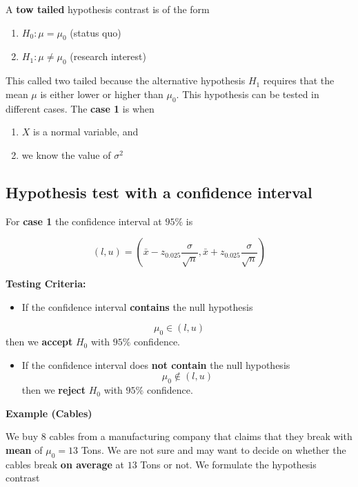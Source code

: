 \documentclass[
]{book}
\providecommand{\tightlist}{%
  \setlength{\itemsep}{0pt}\setlength{\parskip}{0pt}}
\begin{document}
A \textbf{tow tailed} hypothesis contrast is of the form

\begin{enumerate}
\def\labelenumi{\alph{enumi}.}
\tightlist
\item
  \(H_0:\mu = \mu_0\) (status quo)
\item
  \(H_1:\mu \neq \mu_0\) (research interest)
\end{enumerate}

This called two tailed because the alternative hypothesis \(H_1\) requires that the mean \(\mu\) is either lower or higher than \(\mu_0\). This hypothesis can be tested in different cases. The \textbf{case 1} is when

\begin{enumerate}
\def\labelenumi{\arabic{enumi}.}
\tightlist
\item
  \(X\) is a normal variable, and
\item
  we know the value of \(\sigma^2\)
\end{enumerate}

\hypertarget{hypothesis-test-with-a-confidence-interval}{%
\subsection{Hypothesis test with a confidence interval}\label{hypothesis-test-with-a-confidence-interval}}

For \textbf{case 1} the confidence interval at \(95\%\) is

\[(l,u)=(\bar{x}-z_{0.025} \frac{\sigma}{\sqrt{n}}, \bar{x}+z_{0.025} \frac{\sigma}{\sqrt{n}})\]

\textbf{Testing Criteria:}

\begin{itemize}
\tightlist
\item
  If the confidence interval \textbf{contains} the null hypothesis
\end{itemize}

\[\mu_0\in (l,u)\] then we \textbf{accept} \(H_0\) with \(95\%\) confidence.

\begin{itemize}
\tightlist
\item
  If the confidence interval does \textbf{not contain} the null hypothesis\[\mu_0\notin (l,u)\] then we \textbf{reject} \(H_0\) with \(95\%\) confidence.
\end{itemize}

\textbf{Example (Cables)}

We buy \(8\) cables from a manufacturing company that claims that they break with \textbf{mean} of \(\mu_0=13\) Tons. We are not sure and may want to decide on whether the cables break \textbf{on average} at \(13\) Tons or not. We formulate the hypothesis contrast
\end{document}
